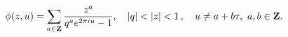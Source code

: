 \begin{equation}
\phi(z,u)=\sum_{a\in{\bf Z}} \frac{z^a  }
{q^a e^{2\pi i  u }-1}, \quad |q|<|z|<1\,, \quad u\neq a+b\tau,~
a,b\in{\bf Z}.
\label{Ser1'}
\end{equation}

